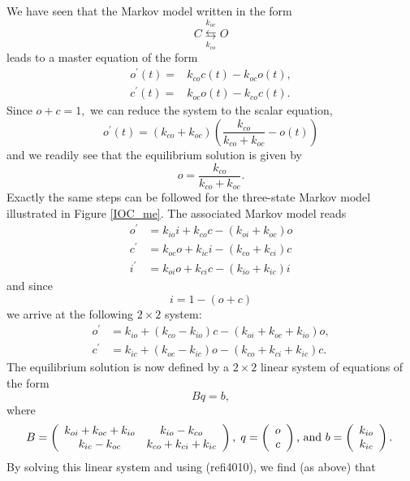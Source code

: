 We have seen that the Markov model written in the form
\begin{equation}
C\underset{k_{co}}{\overset{k_{oc}}{\leftrightarrows}}O \label{Markov1010}
\end{equation}
leads to a master equation of the form
\begin{align}
o^{\prime}(t)=  &  k_{co}c(t)-k_{oc}o(t),\label{po1010}\\
c^{\prime}(t)=  &  k_{oc}o(t)-k_{co}c(t). \label{pc1010}
\end{align}
Since $o+c=1,$ we can reduce the system to the scalar equation,
\[
o^{\prime}(t)=\left(  k_{co}+k_{oc}\right)  \left(  \frac{k_{co}}
{k_{co}+k_{oc}}-o\left(  t\right)  \right)
\]
and we readily see that the equilibrium solution is given by
\[
o=\frac{k_{co}}{k_{co}+k_{oc}}.
\]
Exactly the same steps can be followed for the three-state Markov model
illustrated in Figure \ref{IOC_me}. The associated Markov model reads
\begin{align*}
o^{\prime} &  =k_{io}i+k_{co}c-\left(  k_{oi}+k_{oc}\right)  o\\
c^{\prime} &  =k_{oc}o+k_{ic}i-\left(  k_{co}+k_{ci}\right)  c\\
i^{\prime} &  =k_{oi}o+k_{ci}c-\left(  k_{io}+k_{ic}\right)  i
\end{align*}
and since
\begin{equation}
i=1-\left(  o+c\right)  \label{i4010}
\end{equation}
we arrive at the following $2 \times 2$ system:
\begin{align*}
o^{\prime} &  =k_{io}+\left(  k_{co}-k_{io}\right)  c-\left(  k_{oi}
+k_{oc}+k_{io}\right)  o,\\
c^{\prime} &  =k_{ic}+\left(  k_{oc}-k_{ic}\right)  o-\left(  k_{co}
+k_{ci}+k_{ic}\right)  c.
\end{align*}
The equilibrium solution is now defined by a $2 \times 2$ linear system of equations of
the form
\begin{equation}
Bq=b,\label{i4011}
\end{equation}
where
\[
B=\left(
\begin{array}
[c]{cc}
k_{oi}+k_{oc}+k_{io} & k_{io}-k_{co}\\
k_{ic}-k_{oc} & k_{co}+k_{ci}+k_{ic}
\end{array}
\right)  ,\;q=\left(
\begin{array}
[c]{c}
o\\
c
\end{array}
\right)  \text{, and }b=\left(
\begin{array}
[c]{c}
k_{io}\\
k_{ic}
\end{array}
\right)  .\;
\]
By solving this linear system and using (ref{i4010}), we
find (as above) that

